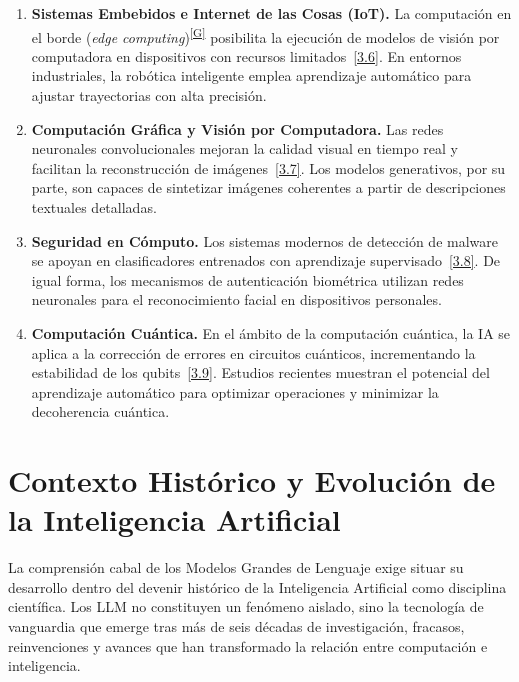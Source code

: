 \documentclass[12pt,a4paper]{report}
\numberwithin{figure}{section}
\begin{document}
\begin{enumerate}
    \item \textbf{Sistemas Embebidos e Internet de las Cosas (IoT).}  
    La computación en el borde (\textit{edge computing})\textsuperscript{\hyperref[glos:edgecomputing]{[G]}} posibilita la ejecución de modelos de visión por computadora en dispositivos con recursos limitados~\hyperref[ref:3.6]{[3.6]}. En entornos industriales, la robótica inteligente emplea aprendizaje automático para ajustar trayectorias con alta precisión.

    \item \textbf{Computación Gráfica y Visión por Computadora.}  
    Las redes neuronales convolucionales mejoran la calidad visual en tiempo real y facilitan la reconstrucción de imágenes~\hyperref[ref:3.7]{[3.7]}. Los modelos generativos, por su parte, son capaces de sintetizar imágenes coherentes a partir de descripciones textuales detalladas.

    \item \textbf{Seguridad en Cómputo.}  
    Los sistemas modernos de detección de malware se apoyan en clasificadores entrenados con aprendizaje supervisado~\hyperref[ref:3.8]{[3.8]}. De igual forma, los mecanismos de autenticación biométrica utilizan redes neuronales para el reconocimiento facial en dispositivos personales.

    \item \textbf{Computación Cuántica.}  
    En el ámbito de la computación cuántica, la IA se aplica a la corrección de errores en circuitos cuánticos, incrementando la estabilidad de los qubits~\hyperref[ref:3.9]{[3.9]}. Estudios recientes muestran el potencial del aprendizaje automático para optimizar operaciones y minimizar la decoherencia cuántica.
\end{enumerate}


\section[Contexto Histórico y Evolución de la IA]{Contexto Histórico y Evolución de la Inteligencia Artificial}
\label{sec:contexto_llms}

La comprensión cabal de los Modelos Grandes de Lenguaje exige situar su desarrollo dentro del devenir histórico de la Inteligencia Artificial como disciplina científica. Los LLM no constituyen un fenómeno aislado, sino la tecnología de vanguardia que emerge tras más de seis décadas de investigación, fracasos, reinvenciones y avances que han transformado la relación entre computación e inteligencia.
\end{document}

